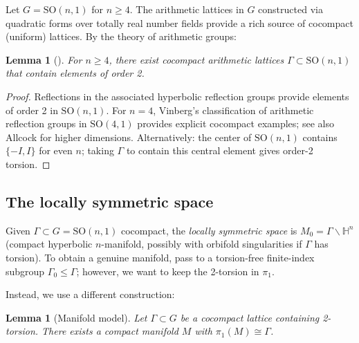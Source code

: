 \documentclass[12pt]{article}
\newtheorem{lemma}[theorem]{Lemma}
\theoremstyle{definition}
\theoremstyle{remark}
\begin{document}
Let $G = \mathrm{SO}(n,1)$ for $n \geq 4$.  The arithmetic lattices in $G$
constructed via quadratic forms over totally real number fields provide a rich
source of cocompact (uniform) lattices.  By the theory of arithmetic groups:

\begin{lemma}[\cite{Vinberg}]\label{lem:2torsion}
For $n \geq 4$, there exist cocompact arithmetic lattices $\Gamma \subset
\mathrm{SO}(n,1)$ that contain elements of order 2.
\end{lemma}

\begin{proof}
Reflections in the associated hyperbolic reflection groups provide elements
of order 2 in $\mathrm{SO}(n,1)$.  For $n = 4$, Vinberg's classification of
arithmetic reflection groups in $\mathrm{SO}(4,1)$ provides explicit cocompact
examples; see also Allcock \cite{Allcock} for higher dimensions.
Alternatively: the center of $\mathrm{SO}(n,1)$ contains $\{-I,I\}$ for even
$n$; taking $\Gamma$ to contain this central element gives order-2 torsion.
\end{proof}

\subsection{The locally symmetric space}

Given $\Gamma\subset G = \mathrm{SO}(n,1)$ cocompact, the \emph{locally
symmetric space} is $M_0 = \Gamma\backslash\mathbb{H}^n$ (compact hyperbolic
$n$-manifold, possibly with orbifold singularities if $\Gamma$ has torsion).
To obtain a genuine manifold, pass to a torsion-free finite-index subgroup
$\Gamma_0 \leq \Gamma$; however, we want to keep the 2-torsion in $\pi_1$.

Instead, we use a different construction:

\begin{lemma}[Manifold model]\label{lem:manifold}
Let $\Gamma\subset G$ be a cocompact lattice containing 2-torsion.  There
exists a compact manifold $M$ with $\pi_1(M) \cong \Gamma$.
\end{lemma}
\end{document}
